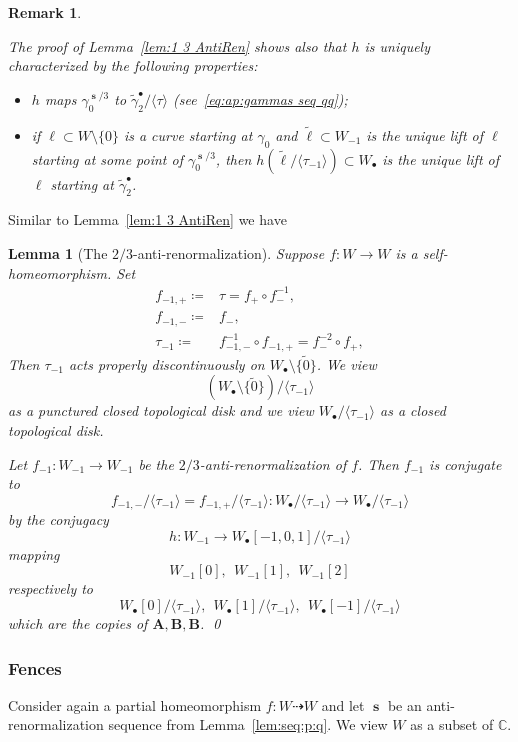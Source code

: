 \documentclass[]{amsart}
\renewcommand{\sp}{{\ \ }}
\newcommand\seq{{\operatorname{\mathbf s}}}
\newcommand\oseq{{\bullet}}
\newcommand{\A}{\mathbf A}
\newcommand{\B}{\mathbf B}
\newcommand\wgamma{{\widetilde \gamma}}
\newcommand{\C}{\mathbb{C}}
\newtheorem{lem}[thm]{Lemma}
\newtheorem{rem}[thm]{Remark}
\theoremstyle{remark}
\numberwithin{equation}{section}
\theoremstyle{definition}
\begin{document}
\begin{rem}
\label{rem:lem:1 3 AntiRen} 

The proof of Lemma~\ref{lem:1 3 AntiRen} shows also that 
$h$ is uniquely characterized by the following properties:
\begin{itemize}
\item $h$ maps $\gamma_0^{\seq/3}$ to $\wgamma_2^\oseq /\langle\tau\rangle$ (see~\eqref{eq:ap:gammas seq qq});
\item if $\ell\subset W\setminus \{0\}$ is a curve starting at $\gamma_0$ and $\widetilde \ell\subset W_{-1} $ is the unique lift of $\ell$ starting at some point of $\gamma_0^{\seq/3}$, then $h(\widetilde \ell /\langle\tau_{-1} \rangle)\subset W_\oseq$ is the unique lift of $\ell$ starting at $\wgamma_2^\oseq$.   
\end{itemize}
\end{rem}

Similar to Lemma~\ref{lem:1 3 AntiRen} we have
\begin{lem}[The $2/3$-anti-renormalization]
\label{lem:2 3 AntiRen} Suppose $f\colon W\to W$ is a self-homeomorphism.
Set
\begin{align*}
f_{-1,+}\coloneqq& \tau =f_+\circ f_-^{-1}, \\
f_{-1,-}\coloneqq&f_{-},\\
\tau_{-1}\coloneqq&f_{-1,-}^{-1}\circ f_{-1,+}= f^{-2}_{-}\circ f_+,
\end{align*}
Then  $\tau_{-1}$ acts properly discontinuously on $W_{\oseq}\setminus \{\widetilde 0\}$. We view \[\left(W_{\oseq}\setminus \{\widetilde 0\}\right)/\langle\tau_{-1} \rangle\] as a punctured closed topological disk and we view $ W_\oseq /\langle \tau_{-1} \rangle$ as a closed topological disk.


Let $f_{-1}\colon W_{-1}\to W_{-1}$ be the $2/3$-anti-renormalization of $f$. Then $f_{-1}$ is  conjugate to 
 \[ f_{-1,-}^{}/\langle \tau_{-1} \rangle = f_{-1,+}/\langle \tau_{-1} \rangle\colon W_\oseq /\langle \tau_{-1} \rangle\to W_\oseq /\langle \tau_{-1} \rangle  \]
 by the conjugacy \[h\colon W_{-1}\to W_\oseq [-1,0,1]/\langle\tau_{-1}\rangle \] mapping 
 \[W_{-1}[0],\sp W_{-1}[1],\sp  W_{-1}[2]\] respectively to \[ {W_\oseq [0]/\langle \tau_{-1}\rangle},  \sp {W_\oseq[1]/\langle \tau_{-1}\rangle}, \sp{W_\oseq[-1]/\langle \tau_{-1}\rangle}\] which are the copies of $\A,\B,\B$.
\qed
\end{lem}
\subsubsection{Fences}
\label{sss:fences} Consider again a partial homeomorphism $f\colon W\dashrightarrow W$ and let $\seq$ be an anti-renormalization sequence from Lemma~\ref{lem:seq:p:q}. We view $W$ as a subset of $\C$.
\end{document}
